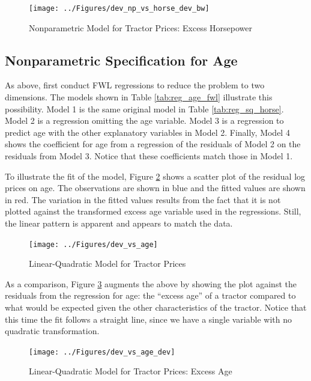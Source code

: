 \documentclass[11pt]{paper}
\begin{document}
\begin{figure}[h!]
  \centering
  \texttt{[image: ../Figures/dev\_np\_vs\_horse\_dev\_bw]}
  \caption{Nonparametric Model for Tractor Prices: Excess Horsepower} \label{fig:dev_np_vs_horse_dev_bw}
\end{figure}





\clearpage
\subsection{Nonparametric Specification for Age}

As above, first conduct FWL regressions 
to reduce the problem to two dimensions. 
The models shown in
Table \ref{tab:reg_age_fwl}
illustrate this possibility. 
Model 1 is the same original model in 
Table \ref{tab:reg_sq_horse}. 
Model 2 is a regression omitting the age variable. 
Model 3 is a regression to predict age with the other explanatory variables in Model 2.
Finally, Model 4 shows the coefficient for age
from a regression of the residuals of Model 2
on the residuals from Model 3. 
Notice that these coefficients match those in Model 1. 



\pagebreak 
To illustrate the fit of the model, 
Figure \ref{fig:dev_vs_age} shows a scatter plot 
of the residual log prices on age. 
The observations are shown in blue
and the fitted values are shown in red.
The variation in the fitted values results from the 
fact that it is not plotted against the transformed excess age variable used in the regressions.
Still, the linear pattern is apparent
and appears to match the data. 

\begin{figure}[h!]
  \centering
  \texttt{[image: ../Figures/dev\_vs\_age]}
  \caption{Linear-Quadratic Model for Tractor Prices} \label{fig:dev_vs_age}
\end{figure}



\pagebreak
As a comparison, Figure \ref{fig:dev_vs_age_dev} 
augments the above by showing the plot against the 
residuals from the regression for age:
the ``excess age'' of a tractor compared to what would be 
expected given the other characteristics of the tractor. 
Notice that this time the fit follows a straight line,
since we have a single variable with no
quadratic transformation.

\begin{figure}[h!]
  \centering
  \texttt{[image: ../Figures/dev\_vs\_age\_dev]}
  \caption{Linear-Quadratic Model for Tractor Prices: Excess Age} \label{fig:dev_vs_age_dev}
\end{figure}
\end{document}
